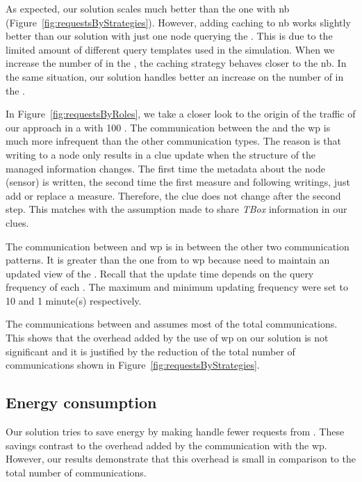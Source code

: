 As expected, our solution scales much better than the one with \ac{nb} (Figure~\ref{fig:requestsByStrategies}).
However, adding caching to \ac{nb} works slightly better than our solution with just one node querying the \Space{}.
This is due to the limited amount of different query templates used in the simulation.
When we increase the number of \consumers{} in the \Space{}, the caching strategy behaves closer to the \ac{nb}.
In the same situation, our solution handles better an increase on the number of \consumers{} in the \Space{}.




In Figure~\ref{fig:requestsByRoles}, we take a closer look to the origin of the traffic of our approach in a \Space{} with 100 \consumers{}.
The communication between the \providers{} and the \ac{wp} is much more infrequent than the other communication types.
The reason is that writing to a node only results in a clue update when the structure of the managed information changes.
The first time the metadata about the node (sensor) is written, the second time the first measure and following writings, just add or replace a measure.
Therefore, the clue does not change after the second step.
This matches with the assumption made to share \emph{TBox} information in our clues.

The communication between \consumers{} and \ac{wp} is in between the other two communication patterns.
It is greater than the one from \providers{} to \ac{wp} because \consumers{} need to maintain an updated view of the \Space{}.
Recall that the update time depends on the query frequency of each \consumer{}.
The maximum and minimum updating frequency were set to 10 and 1 minute(s) respectively.

The communications between \consumers{} and \providers{} assumes most of the total communications.
This shows that the overhead added by the use of \ac{wp} on our solution is not significant and it is justified by the reduction of the total number of communications shown in Figure~\ref{fig:requestsByStrategies}.





\subsection{Energy consumption}
\label{sec:energyConsumption}
Our solution tries to save energy by making \providers{} handle fewer requests from \consumers{}.
These savings contrast to the overhead added by the communication with the \ac{wp}.
However, our results demonstrate that this overhead is small in comparison to the total number of communications.

